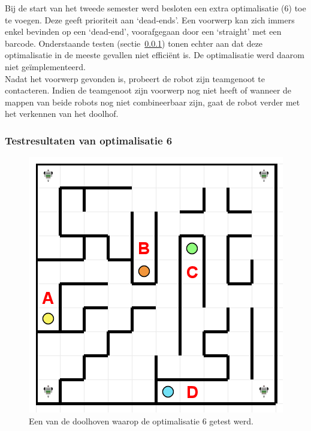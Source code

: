 \documentclass[tt3]{penoverslag}
\begin{document}
Bij de start van het tweede semester werd besloten een extra optimalisatie (6) toe te voegen. Deze geeft prioriteit aan `dead-ends'. Een voorwerp kan zich immers enkel bevinden op een `dead-end', voorafgegaan door een `straight' met een barcode. Onderstaande testen (sectie~\ref{ssec:AlgoZoekTest}) tonen echter aan dat deze optimalisatie in de meeste gevallen niet effici\"ent is. De optimalisatie werd daarom niet ge\"implementeerd.\\

Nadat het voorwerp gevonden is, probeert de robot zijn teamgenoot te contacteren. Indien de teamgenoot zijn voorwerp nog niet heeft of wanneer de mappen van beide robots nog niet combineerbaar zijn, gaat de robot verder met het verkennen van het doolhof. \\

\subsubsection{Testresultaten van optimalisatie 6}
\label{ssec:AlgoZoekTest}

\begin{figure}[!hb]
\centering
	\includegraphics[scale=0.5]{doolhof3}
	\caption{Een van de doolhoven waarop de optimalisatie 6 getest werd.}
\label{fig:TestDead}
\end{figure}
\end{document}
